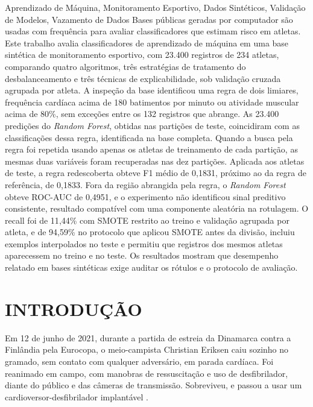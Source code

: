 \begin{resumo}{Aprendizado de Máquina, Monitoramento Esportivo, Dados Sintéticos, Validação de Modelos, Vazamento de Dados}
Bases públicas geradas por computador são usadas com frequência para avaliar classificadores que estimam risco em atletas. Este trabalho avalia classificadores de aprendizado de máquina em uma base sintética de monitoramento esportivo, com 23.400 registros de 234 atletas, comparando quatro algoritmos, três estratégias de tratamento do desbalanceamento e três técnicas de explicabilidade, sob validação cruzada agrupada por atleta. A inspeção da base identificou uma regra de dois limiares, frequência cardíaca acima de 180 batimentos por minuto ou atividade muscular acima de 80\%, sem exceções entre os 132 registros que abrange. As 23.400 predições do \textit{Random Forest}, obtidas nas partições de teste, coincidiram com as classificações dessa regra, identificada na base completa. Quando a busca pela regra foi repetida usando apenas os atletas de treinamento de cada partição, as mesmas duas variáveis foram recuperadas nas dez partições. Aplicada aos atletas de teste, a regra redescoberta obteve F1 médio de 0{,}1831, próximo ao da regra de referência, de 0{,}1833. Fora da região abrangida pela regra, o \textit{Random Forest} obteve ROC-AUC de 0{,}4951, e o experimento não identificou sinal preditivo consistente, resultado compatível com uma componente aleatória na rotulagem. O recall foi de 11{,}44\% com SMOTE restrito ao treino e validação agrupada por atleta, e de 94{,}59\% no protocolo que aplicou SMOTE antes da divisão, incluiu exemplos interpolados no teste e permitiu que registros dos mesmos atletas aparecessem no treino e no teste. Os resultados mostram que desempenho relatado em bases sintéticas exige auditar os rótulos e o protocolo de avaliação.
\end{resumo}

\chapter{INTRODUÇÃO}

Em 12 de junho de 2021, durante a partida de estreia da Dinamarca contra a Finlândia pela Eurocopa, o meio-campista Christian Eriksen caiu sozinho no gramado, sem contato com qualquer adversário, em parada cardíaca. Foi reanimado em campo, com manobras de ressuscitação e uso de desfibrilador, diante do público e das câmeras de transmissão. Sobreviveu, e passou a usar um cardioversor-desfibrilador implantável \cite{aljazeera2021}.

